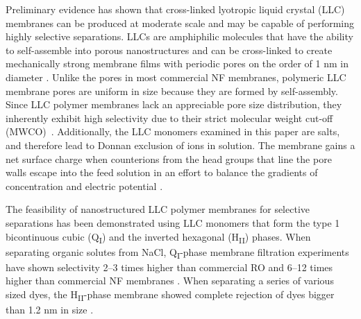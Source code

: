 \documentclass[journal=jpcbfk,manuscript=article]{achemso}
\begin{document}


  Preliminary evidence has shown that cross-linked lyotropic liquid crystal
  (LLC) membranes can be produced at moderate scale and may be capable of performing highly selective
  separations. LLCs are amphiphilic molecules that have the ability to
  self-assemble into porous nanostructures \cite{smith_ordered_1997} and can be
  cross-linked to create mechanically strong membrane films with periodic pores on the
  order of 1 nm in diameter \cite{zhou_supported_2005}. Unlike the pores in most commercial NF
  membranes, polymeric LLC membrane pores are uniform in size because they are
  formed by self-assembly. Since LLC polymer membranes lack an appreciable pore size distribution, they
  inherently exhibit high selectivity due to their strict molecular weight
  cut-off (MWCO)~\cite{zhou_supported_2005}. Additionally, the LLC monomers
  examined in this paper are salts, and therefore lead to Donnan exclusion of
  ions in solution. The membrane gains a net surface charge when counterions from
  the head groups that line the pore walls escape into the feed solution in an
  effort to balance the gradients of concentration and electric potential
  \cite{donnan_theory_1995}.    

  The feasibility of nanostructured LLC polymer membranes for selective separations has
  been demonstrated using LLC monomers that form the type 1 bicontinuous cubic
  (Q\textsubscript{I})
  \cite{hatakeyama_water_2011,hatakeyama_nanoporous_2010,carter_glycerol-based_2012}
  and the inverted hexagonal (H\textsubscript{II}) \cite{zhou_supported_2005}
  phases. When separating organic solutes from NaCl, Q\textsubscript{I}-phase
  membrane filtration experiments have shown selectivity 2--3 times higher than
  commercial RO and 6--12 times higher than commercial NF membranes
  \cite{dischinger_application_2017}. When separating a series of various sized
  dyes, the H\textsubscript{II}-phase membrane showed complete rejection of dyes
  bigger than 1.2 nm in size \cite{zhou_supported_2005}. 
\end{document}
